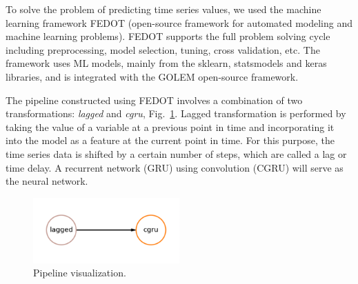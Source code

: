 \documentclass[runningheads]{llncs}
\begin{document}
To solve the problem of predicting time series values, we used the machine learning framework FEDOT \cite{FEDOT,nikitin2022automated} (open-source framework for automated modeling and machine learning problems). FEDOT supports the full problem solving cycle including preprocessing, model selection, tuning, cross validation, etc. The framework uses ML models, mainly from the sklearn, statsmodels and keras libraries, and is integrated with the GOLEM open-source framework.

The pipeline constructed using FEDOT involves a combination of two transformations: \textit{lagged} and \textit{cgru}, Fig.~\ref{fig2}. Lagged transformation is performed by taking the value of a variable at a previous point in time and incorporating it into the model as a feature at the current point in time. For this purpose, the time series data is shifted by a certain number of steps, which are called  a lag  or time delay. A recurrent network (GRU) using convolution (CGRU) will serve as the neural network.

\begin{figure}
\center
\includegraphics[width=0.5\textwidth]{fig2.png}
\caption{Pipeline visualization.} \label{fig2}
\end{figure}
\end{document}
